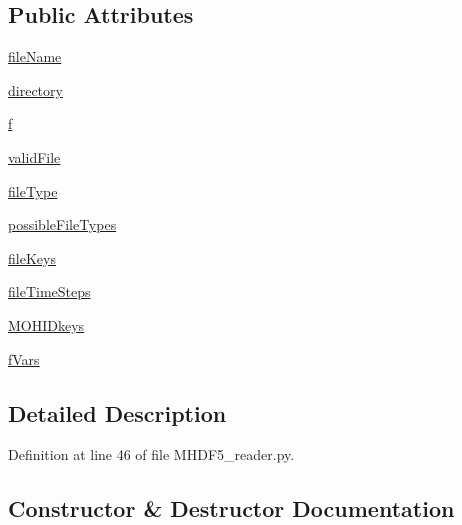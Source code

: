 \subsection*{Public Attributes}
\begin{DoxyCompactItemize}
\item 
\mbox{\hyperlink{class_m_h_d_f5__reader_1_1_m_h_d_f5_reader_acfb0f212ab6190056926277fbc215ff4}{file\+Name}}
\item 
\mbox{\hyperlink{class_m_h_d_f5__reader_1_1_m_h_d_f5_reader_abb791fb16427504bfe7dfa73204747e9}{directory}}
\item 
\mbox{\hyperlink{class_m_h_d_f5__reader_1_1_m_h_d_f5_reader_a60187e1fcb12621bc2b2ea884e94bcdf}{f}}
\item 
\mbox{\hyperlink{class_m_h_d_f5__reader_1_1_m_h_d_f5_reader_a3851a933c4dd5d4d33f38dfe120e134e}{valid\+File}}
\item 
\mbox{\hyperlink{class_m_h_d_f5__reader_1_1_m_h_d_f5_reader_a4466a0d3c951c592c63e01ef5650bdc6}{file\+Type}}
\item 
\mbox{\hyperlink{class_m_h_d_f5__reader_1_1_m_h_d_f5_reader_a0e8a8ab15e9fff5f77171f3245b62519}{possible\+File\+Types}}
\item 
\mbox{\hyperlink{class_m_h_d_f5__reader_1_1_m_h_d_f5_reader_af670ddb7c8ff35188fe942d691e1da70}{file\+Keys}}
\item 
\mbox{\hyperlink{class_m_h_d_f5__reader_1_1_m_h_d_f5_reader_a9868373583eab6032aecdca5858b4ed7}{file\+Time\+Steps}}
\item 
\mbox{\hyperlink{class_m_h_d_f5__reader_1_1_m_h_d_f5_reader_a760486fbdbec4b97176169efd053c764}{M\+O\+H\+I\+Dkeys}}
\item 
\mbox{\hyperlink{class_m_h_d_f5__reader_1_1_m_h_d_f5_reader_a1e4ad7077adcc63c9b60ce626b84711f}{f\+Vars}}
\end{DoxyCompactItemize}


\subsection{Detailed Description}


Definition at line 46 of file M\+H\+D\+F5\+\_\+reader.\+py.



\subsection{Constructor \& Destructor Documentation}
\mbox{\label{class_m_h_d_f5__reader_1_1_m_h_d_f5_reader_a11826c8a3513ad304efedf7a63ceb992}} 
